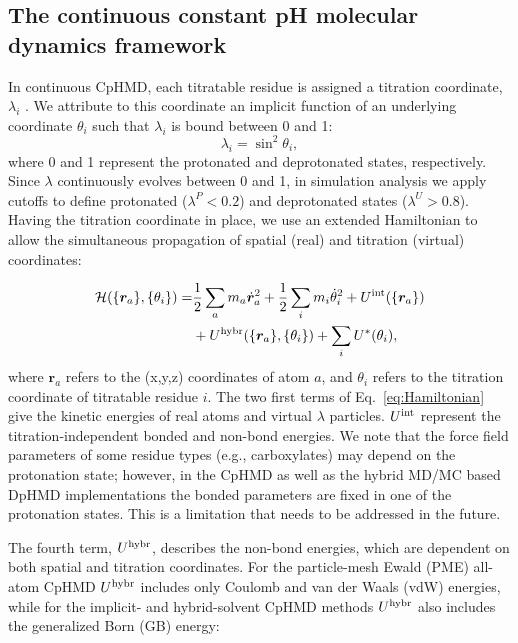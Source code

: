 \subsection{The continuous constant pH molecular dynamics framework}

In continuous CpHMD, each titratable residue is assigned a titration coordinate, $\lambda_i$ \cite{Lee_Brooks_2004_Proteins,Khandogin_Brooks_2005_Biophys.J.}. 
We attribute to this coordinate an implicit function of an underlying coordinate $\theta_i$ such that $\lambda_i$ is bound between 0 and 1:
\begin{equation}
    \lambda_i = \sin^2\theta_i,
\end{equation}
where 0 and 1 represent the protonated and deprotonated states, respectively. 
Since $\lambda$ continuously evolves between 0 and 1,
in simulation analysis we apply cutoffs to define
protonated ($\lambda^P < 0.2$) and deprotonated states ($\lambda^U > 0.8$). 
Having the titration coordinate in place, we use an extended Hamiltonian to allow the simultaneous propagation of spatial (real) and titration (virtual) coordinates:

\begin{equation}
\begin{split}
\label{eq:Hamiltonian}
\mathcal{H}(\{\bm{r}_a\},\{\theta_i\})=
&\frac{1}{2}\sum_am_a\dot{\bm{r}}_a^2+\frac{1}{2}\sum_im_i\dot{\theta}_i^2+U^{\rm int}(\{\bm{r}_a\})\\
&+U^{\rm hybr}(\{\bm{r}_a\},\{\theta_i\})+\sum_iU^{\ast}(\theta_i),
\end{split}
\end{equation}
where $\bm{r}_a$ refers to the (x,y,z) coordinates
of atom $a$, and $\theta_i$ refers to the titration coordinate of titratable residue $i$. 
The two first terms of Eq.~\ref{eq:Hamiltonian} give the kinetic energies of real atoms 
and virtual $\lambda$ particles. 
$U^{\rm int}$ represent the titration-independent bonded and non-bond energies. 
We note that the force field parameters of some residue types (e.g., carboxylates) may
depend on the protonation state; however, in the CpHMD \cite{Khandogin_Brooks_2005_Biophys.J.}
as well as the hybrid MD/MC based DpHMD \cite{Mongan_McCammon_2004_J.Comput.Chem.}
implementations the bonded parameters 
are fixed in one of the protonation states.
This is a limitation that needs to be addressed in the future.

The fourth term, $U^{\rm hybr}$, describes the 
non-bond energies, which are dependent on both spatial and titration coordinates. 
For the particle-mesh Ewald (PME) all-atom CpHMD
\cite{Huang_Shen_2016_J.Chem.TheoryComput.}
$U^{\rm hybr}$ includes only Coulomb and van der Waals (vdW) energies, while for
the implicit- and hybrid-solvent CpHMD methods $U^{\rm hybr}$ also includes the generalized Born (GB) energy:
 
